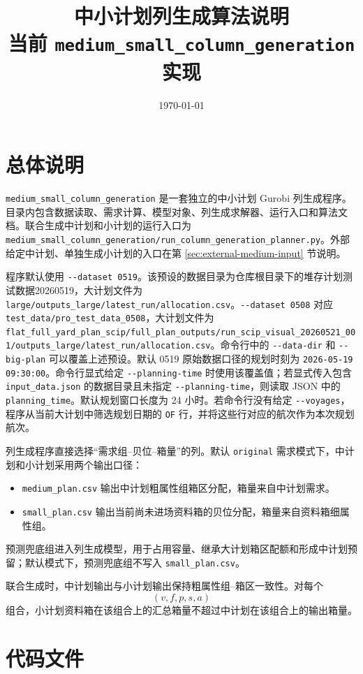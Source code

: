 \documentclass[UTF8,a4paper,11pt]{ctexart}
\title{中小计划列生成算法说明\\
\large 当前 \texttt{medium\_small\_column\_generation} 实现}
\author{}
\date{\today}
\newcommand{\code}[1]{\nolinkurl{#1}}
\begin{document}
\maketitle
\tableofcontents
\newpage

\section{总体说明}

\code{medium_small_column_generation} 是一套独立的中小计划 Gurobi 列生成程序。目录内包含数据读取、需求计算、模型对象、列生成求解器、运行入口和算法文档。联合生成中计划和小计划的运行入口为
\code{medium_small_column_generation/run_column_generation_planner.py}。外部给定中计划、单独生成小计划的入口在第 \ref{sec:external-medium-input} 节说明。

程序默认使用 \code{--dataset 0519}。该预设的数据目录为仓库根目录下的堆存计划测试数据20260519，大计划文件为 \code{large/outputs_large/latest_run/allocation.csv}。\code{--dataset 0508} 对应 \code{test_data/pro_test_data_0508}，大计划文件为 \code{flat_full_yard_plan_scip/full_plan_outputs/run_scip_visual_20260521_001/outputs_large/latest_run/allocation.csv}。命令行中的 \code{--data-dir} 和 \code{--big-plan} 可以覆盖上述预设。默认 0519 原始数据口径的规划时刻为 \code{2026-05-19 09:30:00}。命令行显式给定 \code{--planning-time} 时使用该覆盖值；若显式传入包含 \code{input_data.json} 的数据目录且未指定 \code{--planning-time}，则读取 JSON 中的 \code{planning_time}。默认规划窗口长度为 24 小时。若命令行没有给定 \code{--voyages}，程序从当前大计划中筛选规划日期的 \code{OF} 行，并将这些行对应的航次作为本次规划航次。

列生成程序直接选择“需求组--贝位--箱量”的列。默认 \code{original} 需求模式下，中计划和小计划采用两个输出口径：
\begin{itemize}
  \item \code{medium_plan.csv} 输出中计划粗属性组箱区分配，箱量来自中计划需求。
  \item \code{small_plan.csv} 输出当前尚未进场资料箱的贝位分配，箱量来自资料箱细属性组。
\end{itemize}
预测兜底组进入列生成模型，用于占用容量、继承大计划箱区配额和形成中计划预留；默认模式下，预测兜底组不写入 \code{small_plan.csv}。

联合生成时，中计划输出与小计划输出保持粗属性组--箱区一致性。对每个
\[
(v,f,p,s,a)
\]
组合，小计划资料箱在该组合上的汇总箱量不超过中计划在该组合上的输出箱量。

\section{代码文件}
\end{document}
